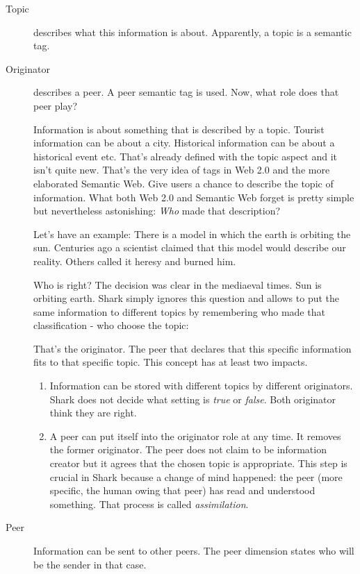\begin{description}
    \item[Topic] describes what this information is about. Apparently, a topic is a semantic tag.
    \item[Originator] describes a peer. A peer semantic tag is used. Now, what role does that peer play?

Information is about something that is described by a topic. Tourist information can be about a city. Historical information can be about a historical event etc. That's already defined with the topic aspect and it isn't quite new. That's the very idea of tags in Web 2.0 and the more elaborated Semantic Web. Give users a chance to describe the topic of information. What both Web 2.0 and Semantic Web forget is pretty simple but nevertheless astonishing:
{\it Who} made that description?

Let's have an example:
There is a model in which the earth is orbiting the sun. Centuries ago a scientist claimed that this model would describe our reality. Others called it heresy and burned him.

Who is right? The decision was clear in the  mediaeval times. Sun is orbiting earth. Shark simply ignores this question and allows to put the same information to different topics by remembering who made that classification - who choose the topic:

That's the originator. The peer that declares that this specific information fits to that specific topic. This concept has at least two impacts.

\begin{enumerate}
\item
Information can be stored with different topics by different originators. Shark does not decide what setting is {\it true} or {\it false}. Both originator think they are right.

\item
A peer can put itself into the originator role at any time. It removes the former originator. The peer does not claim to be information creator but it agrees that the chosen topic is appropriate. This step is crucial in Shark because a change of mind happened: the peer (more specific, the human owing that peer) has read and understood something. That process is called {\it assimilation}.
\end{enumerate}

    \item[Peer] Information can be sent to other peers. The peer dimension states who will be the sender in that case.


\end{description}
